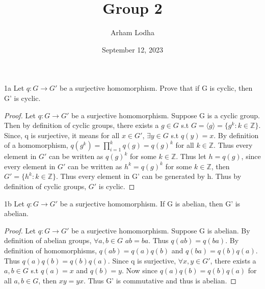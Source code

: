 \documentclass{article}
\newcommand{\Z}{\mathbb{Z}}
\newcommand*{\ANG}[1]{\langle #1 \rangle}
\begin{document}
\title{Group 2}
\author{Arham Lodha}%
\date{September 12, 2023}%
\maketitle

\begin{claim}{1a}
    Let $q:G \to G'$ be a surjective homomorphism. Prove that if G is cyclic, then G' is cyclic.
\end{claim}
\begin{proof}
    Let $q:G \to G'$ be a surjective homomorphism. Suppose G is a cyclic group. Then by definition of cyclic groups, there exists a $g \in G$ s.t $G = \ANG{g} = \{g^k : k \in \Z\}$. Since, q is surjective, it means for all $x \in G'$, $\exists y \in G$ s.t $q(y) = x$. By definition of a homomorphism, $q(g^k) = \prod_{i=1}^{k}q(g) = q(g)^k$ for all $k \in \Z$. Thus every element in $G'$ can be written as $q(g)^k$ for some $k \in \Z$. Thus let $h = q(g)$, since every element in $G'$ can be written as $h^k = q(g)^k$ for some $k \in \Z$, then $G' = \{h^k : k \in \Z\}$. Thus every element in G' can be generated by h. Thus by definition of cyclic groups, $G'$ is cyclic.
\end{proof}

\begin{claim}{1b}
    Let $q:G \to G'$ be a surjective homomorphism. If G is abelian, then G' is abelian.
\end{claim}
\begin{proof}
    Let $q:G \to G'$ be a surjective homomorphism. Suppose G is abelian. By definition of abelian groups, $\forall a, b \in G$ $ab = ba$. Thus $q(ab) = q(ba)$. By definition of homomorphisms, $q(ab) = q(a)q(b)$ and $q(ba) = q(b)q(a)$. Thus $q(a)q(b) = q(b)q(a)$. Since q is surjective, $\forall x, y \in G'$, there exists a $a, b \in G$ s.t $q(a) = x$ and $q(b) = y$. Now since $q(a)q(b) = q(b)q(a)$ for all $a, b \in G$, then $xy = yx$. Thus G' is commutative and thus is abelian.
\end{proof}

\bigskip
\end{document}
